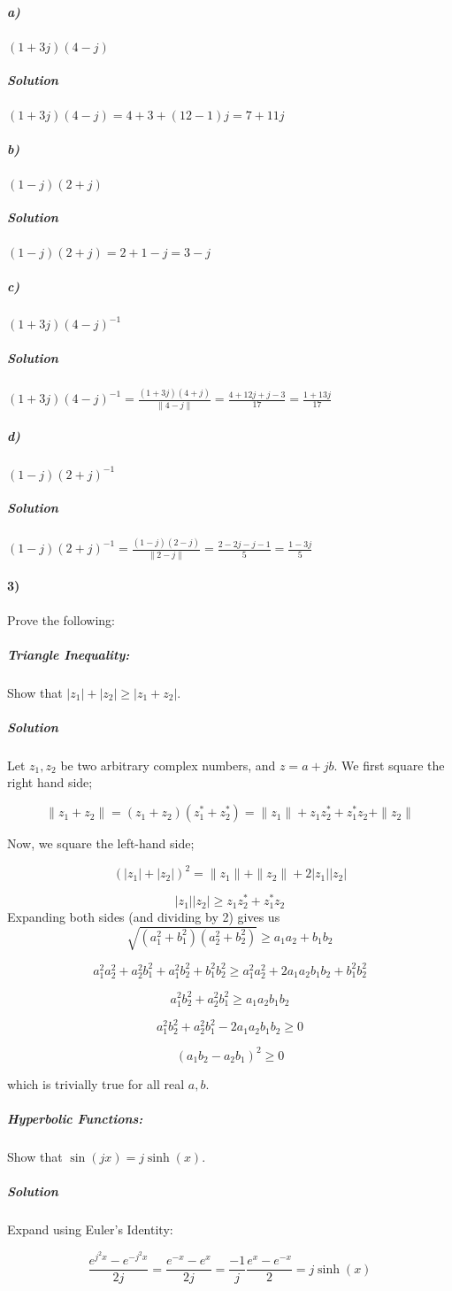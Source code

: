 \documentclass{article}
\begin{document}
\subparagraph{a)} $(1 + 3j)(4  - j)$

\subparagraph{Solution} $(1 + 3j)(4  - j) = 4 + 3 + (12-1)j = \boxed{7+11j}$

\subparagraph{b)} $(1 - j)(2 + j)$

\subparagraph{Solution} $(1 - j)(2 + j) = 2 + 1 - j = \boxed{3 - j}$

\subparagraph{c)} $(1 + 3j)(4-j)^{-1}$

\subparagraph{Solution} $(1+3j)(4-j)^{-1} = \frac{(1+3j)(4+j)}{\|4-j\|} = \frac{4+12j+j-3}{17} = \boxed{\frac{1+13j}{17}}$

\subparagraph{d)} $(1 - j)(2 + j)^{-1}$ 

\subparagraph{Solution} $(1-j)(2+j)^{-1} = \frac{(1-j)(2-j)}{\|2-j\|} = \frac{2-2j-j-1}{5} =\boxed{\frac{1-3j}{5}}$


\newpage

\paragraph{3)} Prove the following:
\subparagraph{Triangle Inequality:} Show that $|z_1| + |z_2| \geq |z_1 + z_2|$.

\subparagraph{Solution} Let $z_1, z_2$ be two arbitrary complex numbers, and $z = a + jb$. We first square the right hand side;

\[
\|z_1 + z_2\| = (z_1 + z_2)(z_1^* + z_2^*) = \|z_1\| + z_1z_2^* + z_1^*z_2 + \|z_2\|
\]

Now, we square the left-hand side;

\[
(|z_1| + |z_2|)^2 = \|z_1\| + \|z_2\| + 2|z_1||z_2|
\]

\[
|z_1||z_2| \geq z_1z_2^* + z_1^*z_2
\]
Expanding both sides (and dividing by 2) gives us
\[
\sqrt{(a_1^2+b_1^2)(a_2^2+b_2^2)} \geq a_1a_2 + b_1b_2
\]

\[
a_1^2a_2^2 + a_2^2b_1^2 + a_1^2b_2^2 + b_1^2b_2^2 \geq a_1^2a_2^2 + 2a_1a_2b_1b_2 +  b_1^2b_2^2
\]

\[
a_1^2b_2^2+a_2^2b_1^2 \geq a_1a_2b_1b_2
\]

\[
a_1^2b_2^2 + a_2^2b_1^2 - 2a_1a_2b_1b_2 \geq 0
\]

\[
(a_1b_2 - a_2b_1)^2 \geq 0
\]

which is trivially true for all real $a,b$.


\subparagraph{Hyperbolic Functions:} Show that $\sin(jx) = j\sinh(x)$.

\subparagraph{Solution} Expand using Euler's Identity:

\[
\frac{e^{j^2x}-e^{-j^2x}}{2j} = \frac{e^{-x}-e^{x}}{2j} = \frac{-1}{j}\frac{e^x-e^{-x}}{2} = j\sinh(x) 
\]
\end{document}
